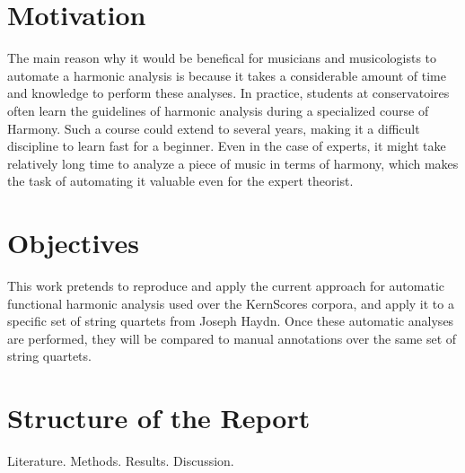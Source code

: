 \section{Motivation}
The main reason why it would be benefical for musicians and musicologists to automate a harmonic analysis is because it takes a considerable amount of time and knowledge to perform these analyses. In practice, students at conservatoires often learn the guidelines of harmonic analysis during a specialized course of Harmony. Such a course could extend to several years, making it a difficult discipline to learn fast for a beginner. Even in the case of experts, it might take relatively long time to analyze a piece of music in terms of harmony, which makes the task of automating it valuable even for the expert theorist.

\section{Objectives}
This work pretends to reproduce and apply the current approach for automatic functional harmonic analysis used over the KernScores corpora, and apply it to a specific set of string quartets from Joseph Haydn. Once these automatic analyses are performed, they will be compared to manual annotations over the same set of string quartets.

\section{Structure of the Report}
Literature. Methods. Results. Discussion.

\newpage
